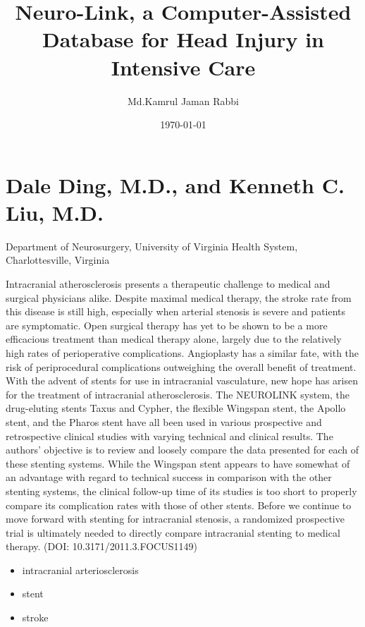\documentclass{article}
\title{Neuro-Link, a Computer-Assisted Database for Head Injury in Intensive Care}
\author{Md.Kamrul Jaman Rabbi}
\date{\today}
\begin{document}
\maketitle
\section*{Dale Ding, M.D., and Kenneth C. Liu, M.D.}
\begin{flushleft}
Department of Neurosurgery, University of Virginia Health System, Charlottesville, Virginia
\end{flushleft}



\begin{flushleft}
Intracranial atherosclerosis presents a therapeutic challenge to medical and surgical physicians alike. Despite 
maximal medical therapy, the stroke rate from this disease is still high, especially when arterial stenosis is severe and 
patients are symptomatic. Open surgical therapy has yet to be shown to be a more efficacious treatment than medical 
therapy alone, largely due to the relatively high rates of perioperative complications. Angioplasty has a similar fate, 
with the risk of periprocedural complications outweighing the overall benefit of treatment. With the advent of stents 
for use in intracranial vasculature, new hope has arisen for the treatment of intracranial atherosclerosis. The NEUROLINK system, the drug-eluting stents Taxus and Cypher, the flexible Wingspan stent, the Apollo stent, and the Pharos 
stent have all been used in various prospective and retrospective clinical studies with varying technical and clinical 
results. The authors’ objective is to review and loosely compare the data presented for each of these stenting systems. 
While the Wingspan stent appears to have somewhat of an advantage with regard to technical success in comparison 
with the other stenting systems, the clinical follow-up time of its studies is too short to properly compare its complication rates with those of other stents. Before we continue to move forward with stenting for intracranial stenosis, a 
randomized prospective trial is ultimately needed to directly compare intracranial stenting to medical therapy.
(DOI: 10.3171/2011.3.FOCUS1149)
\end{flushleft}

\begin{itemize}
\item intracranial arteriosclerosis  
\item stent
\item  stroke
\end{itemize}
\end{document}
